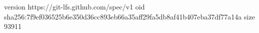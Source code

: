 version https://git-lfs.github.com/spec/v1
oid sha256:7f9ef036525b6e350d36cc893eb66a35aff29fa5db8af41b407eba37df77a14a
size 93911
